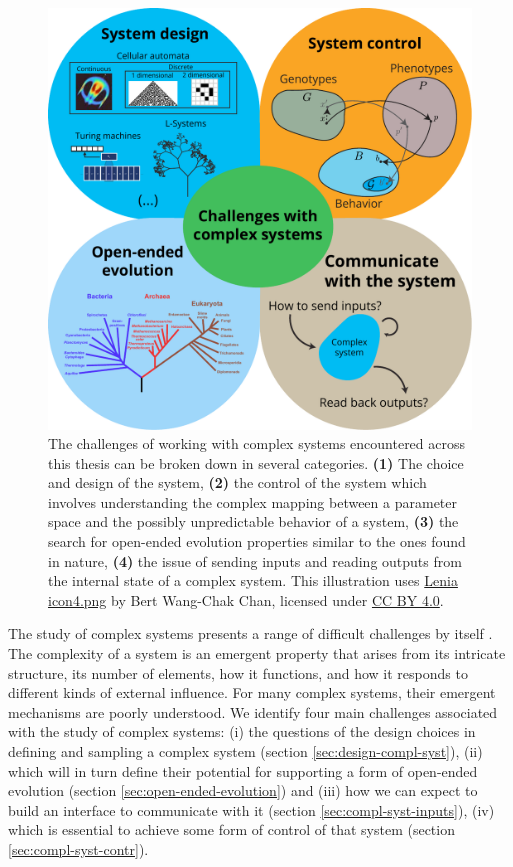 \begin{figure}[htbp]
  \centering
  \includegraphics[width=.98\linewidth]{figures/challenges}
  \caption{The challenges of working with complex systems encountered across
    this thesis can be broken down in several categories. \textbf{(1)} The choice
    and design of the system, \textbf{(2)} the control of the system which
    involves understanding the complex mapping between a parameter space and the
    possibly unpredictable behavior of a system, \textbf{(3)} the search for
    open-ended evolution properties similar to the ones found in nature,
    \textbf{(4)} the issue of sending inputs and reading outputs from the
    internal state of a complex system. This illustration uses
    \href{https://commons.wikimedia.org/wiki/File:Lenia_icon4.png}{Lenia
      icon4.png} by Bert Wang-Chak Chan, licensed under
    \href{https://creativecommons.org/licenses/by-sa/4.0/}{CC BY 4.0}. }
  \label{fig:challenges}
\end{figure}

The study of complex systems presents a range of difficult challenges by itself
\parencite{sanmiguelChallengesComplexSystems2012}. The complexity of a
system is an emergent property that arises from its intricate structure, its
number of elements, how it functions, and how it responds to different kinds of
external influence. For many complex systems, their emergent mechanisms are
poorly understood. We identify four main challenges associated with the study of
complex systems: (i) the questions of the design choices in defining and sampling a
complex system (section \ref{sec:design-compl-syst}), (ii) which will in turn define
their potential for supporting a form of open-ended evolution (section
\ref{sec:open-ended-evolution}) and (iii) how we can expect to build an interface to
communicate with it (section \ref{sec:compl-syst-inputs}), (iv) which is essential to
achieve some form of control of that system (section \ref{sec:compl-syst-contr}).

